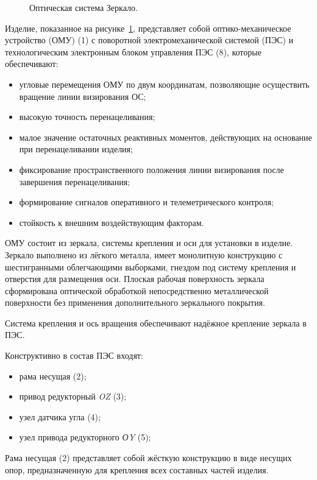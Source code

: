 \begin{figure}[ht] 
	\caption{Оптическая система Зеркало.}
	\label{fig:zerkalo} 
\end{figure}

Изделие, показанное на рисунке~\cref{fig:zerkalo}, представляет собой оптико-механическое устройство (ОМУ) (1) с поворотной электромеханической системой (ПЭС) и технологическим электронным блоком управления ПЭС (8), которые обеспечивают:
\begin{itemize}[beginpenalty=10000] %
	\item угловые перемещения ОМУ по двум координатам, позволяющие осуществить вращение линии визирования ОС;
	\item высокую точность перенацеливания;
	\item малое значение остаточных реактивных моментов, действующих на основание при перенацеливании изделия;
	\item фиксирование пространственного положения линии визирования после завершения перенацеливания;
	\item формирование сигналов оперативного и телеметрического контроля;
	\item стойкость к внешним воздействующим факторам.
\end{itemize}

ОМУ состоит из зеркала, системы крепления и оси для установки в изделие. Зеркало выполнено из лёгкого металла, имеет монолитную конструкцию с шестигранными облегчающими выборками, гнездом под систему крепления и отверстия для размещения оси. Плоская рабочая поверхность зеркала сформирована оптической обработкой непосредственно металлической поверхности без применения дополнительного зеркального покрытия.

Система крепления и ось вращения обеспечивают надёжное крепление зеркала в ПЭС.

Конструктивно в состав ПЭС входят:
\begin{itemize}[beginpenalty=10000] %
	\item рама несущая (2);
	\item привод редукторный \textit{OZ} (3);
	\item узел датчика угла (4);
	\item узел привода редукторного \textit{ОY} (5);
\end{itemize}
Рама несущая (2) представляет собой жёсткую конструкцию в виде несущих опор, предназначенную для крепления всех составных частей изделия.

